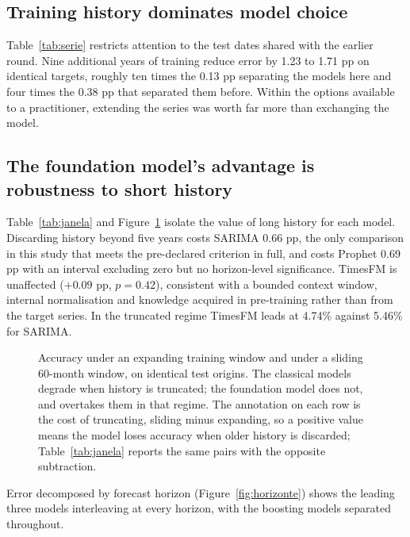 \subsection{Training history dominates model choice}



Table~\ref{tab:serie} restricts attention to the test dates shared with the earlier round.
Nine additional years of training reduce error by 1.23 to 1.71 pp on identical targets,
roughly ten times the 0.13 pp separating the models here and four times the 0.38 pp that
separated them before. Within the options available to a practitioner, extending the series
was worth far more than exchanging the model.

\subsection{The foundation model's advantage is robustness to short history}



Table~\ref{tab:janela} and Figure~\ref{fig:janela} isolate the value of long history for
each model. Discarding history beyond five years costs SARIMA 0.66 pp, the only comparison
in this study that meets the pre-declared criterion in full, and costs Prophet 0.69 pp with
an interval excluding zero but no horizon-level significance. TimesFM is unaffected
($+0.09$ pp, $p=0.42$), consistent with a bounded context window, internal normalisation
and knowledge acquired in pre-training rather than from the target series. In the truncated
regime TimesFM leads at 4.74\% against 5.46\% for SARIMA.

\begin{figure}[htbp]
\centering

\caption{Accuracy under an expanding training window and under a sliding 60-month window,
on identical test origins. The classical models degrade when history is truncated; the
foundation model does not, and overtakes them in that regime. The annotation on each row
is the cost of truncating, sliding minus expanding, so a positive value means the model
loses accuracy when older history is discarded; Table~\ref{tab:janela} reports the same
pairs with the opposite subtraction.}
\label{fig:janela}
\end{figure}

Error decomposed by forecast horizon (Figure~\ref{fig:horizonte}) shows the leading three
models interleaving at every horizon, with the boosting models separated throughout.

